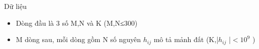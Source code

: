 Dữ liệu
\begin{itemize}
	\item     Dòng đầu là 3 số M,N và  K (M,N≤300)   
	\item     M dòng sau, mỗi dòng gồm N số nguyên $h_{ij}$    mô tả mảnh đất (K,|$h_{ij}$    |$<$$10^{9}$    )   
\end{itemize}